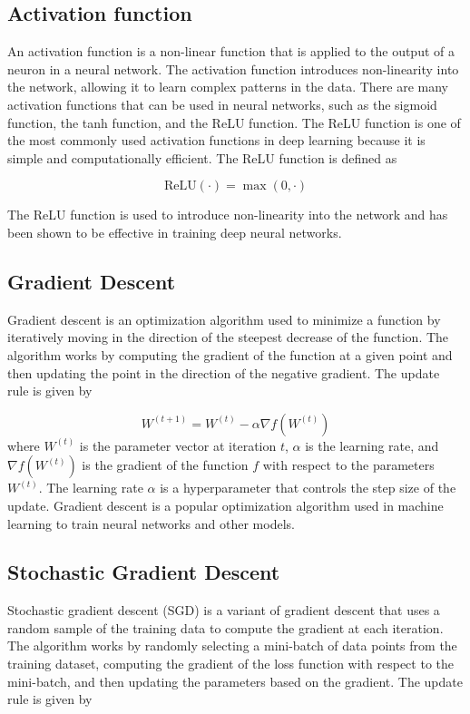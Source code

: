 \subsection{Activation function}
An activation function is a non-linear function that is applied to the output of a neuron in a neural network. The activation function introduces non-linearity into the network, allowing it to learn complex patterns in the data. There are many activation functions that can be used in neural networks, such as the sigmoid function, the tanh function, and the ReLU function. The ReLU function is one of the most commonly used activation functions in deep learning because it is simple and computationally efficient. The ReLU function is defined as

$$
    \textrm{ReLU}(\cdot)=\max(0,\cdot)
$$

The ReLU function is used to introduce non-linearity into the network and has been shown to be effective in training deep neural networks.


\subsection{Gradient Descent}
Gradient descent is an optimization algorithm used to minimize a function by iteratively moving in the direction of the steepest decrease of the function. The algorithm works by computing the gradient of the function at a given point and then updating the point in the direction of the negative gradient. The update rule is given by

$$
    W^{(t+1)} = W^{(t)} - \alpha \nabla f(W^{(t)})
$$
where $W^{(t)}$ is the parameter vector at iteration $t$, $\alpha$ is the learning rate, and $\nabla f(W^{(t)})$ is the gradient of the function $f$ with respect to the parameters $W^{(t)}$. The learning rate $\alpha$ is a hyperparameter that controls the step size of the update. Gradient descent is a popular optimization algorithm used in machine learning to train neural networks and other models.

\subsection{Stochastic Gradient Descent}
Stochastic gradient descent (SGD) is a variant of gradient descent that uses a random sample of the training data to compute the gradient at each iteration. The algorithm works by randomly selecting a mini-batch of data points from the training dataset, computing the gradient of the loss function with respect to the mini-batch, and then updating the parameters based on the gradient. The update rule is given by

